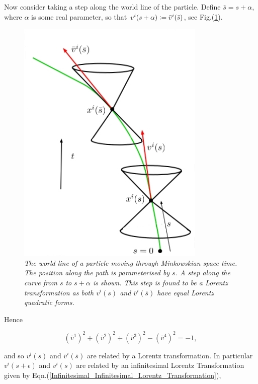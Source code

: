 Now consider taking a step along the world line of the particle. Define $\bar{s} = s + \alpha$, where $\alpha$ is some real parameter, so that $v^i (s+\alpha) \vcentcolon = \bar{v}^i(\bar{s})$, see Fig.(\ref{Infinitesimal_Fig_Steps_Along_Minkowskian}).

\begin{figure}[h!]
\begin{center}
\caption{\textit{The world line of a particle moving through Minkowskian space time. The position along the path is parameterised by $s$. A step along the curve from $s$ to $s+\alpha$ is shown. This step is found to be a Lorentz transformation as both $v^i(s)$ and $\bar{v}^i(\bar{s})$ have equal Lorentz quadratic forms.}}
\label{Infinitesimal_Fig_Steps_Along_Minkowskian}
\includegraphics[scale=0.8]{figs/5_4.jpg}
\end{center}
\end{figure}

\noindent Hence 

\begin{equation*}
({\bar{v}^1})^2  + ({\bar{v}^2})^2 + ({\bar{v}^3})^2  - ({\bar{v}^4})^2 = -1,
\end{equation*}

\noindent and so $v^i(s)$ and $\bar{v}^i(\bar{s})$ are related by a Lorentz transformation. In particular $v^i(s+\epsilon)$ and $v^i(s)$ are related by an infinitesimal Lorentz Transformation given by Eqn.(\ref{Infinitesimal_Infinitesimal_Lorentz_Transformation}),

